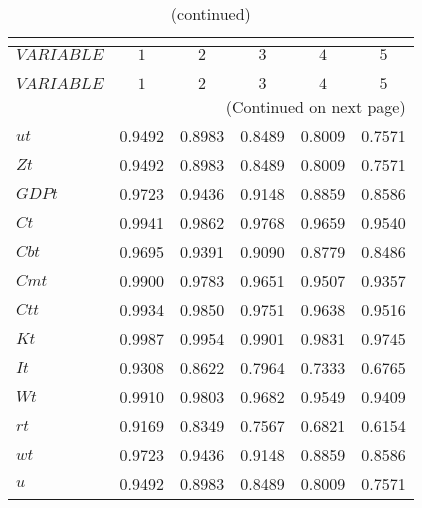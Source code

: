  
\begin{center}
\begin{longtable}{lccccc} 
\caption{AUTOCORRELATION OF SIMULATED VARIABLES}\\
 \label{Table:sim_autocorr_matrix}\\
\toprule 
$VARIABLE  $	 & 	 $         1$	 & 	 $         2$	 & 	 $         3$	 & 	 $         4$	 & 	 $         5$\\
\midrule \endfirsthead 
\caption{(continued)}\\
 \toprule \\ 
$VARIABLE  $	 & 	 $         1$	 & 	 $         2$	 & 	 $         3$	 & 	 $         4$	 & 	 $         5$\\
\midrule \endhead 
\midrule \multicolumn{6}{r}{(Continued on next page)} \\ \bottomrule \endfoot 
\bottomrule \endlastfoot 
$ut        $	 & 	    0.9492	 & 	    0.8983	 & 	    0.8489	 & 	    0.8009	 & 	    0.7571 \\ 
$Zt        $	 & 	    0.9492	 & 	    0.8983	 & 	    0.8489	 & 	    0.8009	 & 	    0.7571 \\ 
$GDPt      $	 & 	    0.9723	 & 	    0.9436	 & 	    0.9148	 & 	    0.8859	 & 	    0.8586 \\ 
$Ct        $	 & 	    0.9941	 & 	    0.9862	 & 	    0.9768	 & 	    0.9659	 & 	    0.9540 \\ 
$Cbt       $	 & 	    0.9695	 & 	    0.9391	 & 	    0.9090	 & 	    0.8779	 & 	    0.8486 \\ 
$Cmt       $	 & 	    0.9900	 & 	    0.9783	 & 	    0.9651	 & 	    0.9507	 & 	    0.9357 \\ 
$Ctt       $	 & 	    0.9934	 & 	    0.9850	 & 	    0.9751	 & 	    0.9638	 & 	    0.9516 \\ 
$Kt        $	 & 	    0.9987	 & 	    0.9954	 & 	    0.9901	 & 	    0.9831	 & 	    0.9745 \\ 
$It        $	 & 	    0.9308	 & 	    0.8622	 & 	    0.7964	 & 	    0.7333	 & 	    0.6765 \\ 
$Wt        $	 & 	    0.9910	 & 	    0.9803	 & 	    0.9682	 & 	    0.9549	 & 	    0.9409 \\ 
$rt        $	 & 	    0.9169	 & 	    0.8349	 & 	    0.7567	 & 	    0.6821	 & 	    0.6154 \\ 
$wt        $	 & 	    0.9723	 & 	    0.9436	 & 	    0.9148	 & 	    0.8859	 & 	    0.8586 \\ 
$u         $	 & 	    0.9492	 & 	    0.8983	 & 	    0.8489	 & 	    0.8009	 & 	    0.7571 \\ 

\end{longtable}
\end{center}
